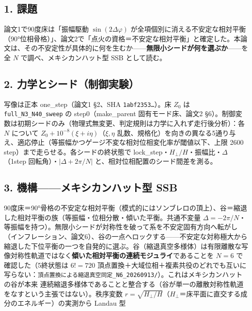 \documentclass[
  a4paper,
]{ltjsarticle}
\begin{document}
\subsection{1. 課題}\label{ux8ab2ux984c}

論文1で90度床は「振幅駆動 \(\sin(2\Delta\varphi)\)
が全項個別に消える不安定な相対平衡（90°位相骨格）」、論文2で「点火の資格＝不安定な相対平衡」と確定した。本論文は、その不安定性が具体的に何を生むか------\textbf{無限小シードが何を選ぶか}------を全
\(N\) で調べ、メキシカンハット型 SSB として読む。

\subsection{2.
力学とシード（制御実験）}\label{ux529bux5b66ux3068ux30b7ux30fcux30c9ux5236ux5fa1ux5b9fux9a13}

写像は正本 one\_step（論文1 §2、SHA \texttt{1abf2353…}）。床 \(Z_0\) は
\texttt{full\_N3\_N40\_sweep} の step0（make\_parent 固有モード床、論文2
§6）。制御変数は初期シードのみ（物理式無変更、判定規則は力学に入れず走行後分析）：各
\(N\) について \(Z_0+10^{-8}(\xi+i\eta)\)（\(\xi,\eta\)
乱数、規格化）を向きの異なる5通り与え、適応停止（等振幅かつゲージ不変な相対位相変化率が閾値以下、上限
2600 step）まで走らせる。各シードの終状態で
lock\_step・\(H_\perp/H\)・振幅比・\(\Delta\)（1step
回転角）・\(|\Delta+2\pi/N|\) と、相対位相配置のシード間差を測る。

\subsection{3. 機構------メキシカンハット型
SSB}\label{ux6a5fux69cbux30e1ux30adux30b7ux30abux30f3ux30cfux30c3ux30c8ux578b-ssb}

90度床＝90°骨格の不安定な相対平衡（模式的にはソンブレロの頂上）、谷＝縮退した相対平衡の族（等振幅・位相分散・傾いた平衡。共通不変量
\(\Delta=-2\pi/N\)・等振幅を持つ）。無限小シードが対称性を破って系を不安定固有方向へ転がし（インフレーション、論文6）、谷の一点へロックする------不安定な対称極大から縮退した下位平衡の一つを自発的に選ぶ。谷（縮退真空多様体）は有限離散な写像対称性軌道ではなく\textbf{傾いた相対平衡の連続モジュライ}であることを
\(N=6\) で確認した（5終状態は \(6!=720\)
頂点置換＋大域位相＋複素共役のどれでも互いに写らない：\texttt{頂点置換による縮退真空同定\_N6\_20260913/}）。これはメキシカンハットの谷が本来
連続縮退多様体であることと整合する（谷が単一の離散対称性軌道をなすという主張ではない）。秩序変数
\(r=\sqrt{H_\perp/H}\)（\(H_\perp\)＝床平面に直交する成分のエネルギー）の実測から
Landau 型
\end{document}
